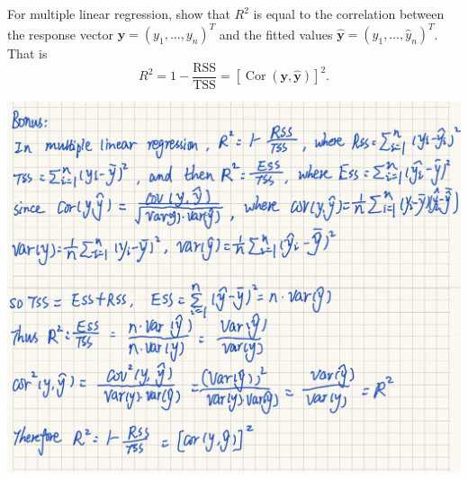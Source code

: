 \documentclass[
]{article}
\begin{document}
For multiple linear regression, show that \(R^2\) is equal to the
correlation between the response vector
\(\mathbf{y} = (y_1, \ldots, y_n)^T\) and the fitted values
\(\hat{\mathbf{y}} = (\hat y_1, \ldots, \hat y_n)^T\). That is \[
R^2 = 1 - \frac{\text{RSS}}{\text{TSS}} = [\operatorname{Cor}(\mathbf{y}, \hat{\mathbf{y}})]^2.
\]

\includegraphics{images/clipboard-1942909937.jpeg}
\end{document}
